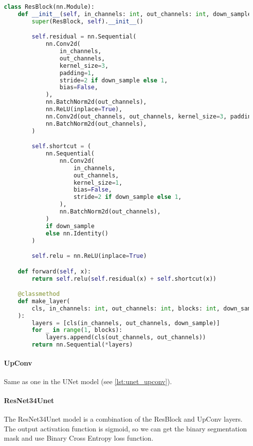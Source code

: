 \begin{lstlisting}[language=Python, caption=models/resnet34\_unet.py: ResBlock, label=lst:resblock]
class ResBlock(nn.Module):
    def __init__(self, in_channels: int, out_channels: int, down_sample: bool = False):
        super(ResBlock, self).__init__()

        self.residual = nn.Sequential(
            nn.Conv2d(
                in_channels,
                out_channels,
                kernel_size=3,
                padding=1,
                stride=2 if down_sample else 1,
                bias=False,
            ),
            nn.BatchNorm2d(out_channels),
            nn.ReLU(inplace=True),
            nn.Conv2d(out_channels, out_channels, kernel_size=3, padding=1, bias=False),
            nn.BatchNorm2d(out_channels),
        )

        self.shortcut = (
            nn.Sequential(
                nn.Conv2d(
                    in_channels,
                    out_channels,
                    kernel_size=1,
                    bias=False,
                    stride=2 if down_sample else 1,
                ),
                nn.BatchNorm2d(out_channels),
            )
            if down_sample
            else nn.Identity()
        )

        self.relu = nn.ReLU(inplace=True)

    def forward(self, x):
        return self.relu(self.residual(x) + self.shortcut(x))

    @classmethod
    def make_layer(
        cls, in_channels: int, out_channels: int, blocks: int, down_sample: bool = False
    ):
        layers = [cls(in_channels, out_channels, down_sample)]
        for _ in range(1, blocks):
            layers.append(cls(out_channels, out_channels))
        return nn.Sequential(*layers)

\end{lstlisting}

\paragraph{UpConv}
Same as one in the UNet model (see \ref{lst:unet_upconv}).

\paragraph{ResNet34Unet}
The ResNet34Unet model is a combination of the ResBlock and UpConv layers. The output activation function is sigmoid, so we can get the binary segmentation mask and use Binary Cross Entropy loss function.

